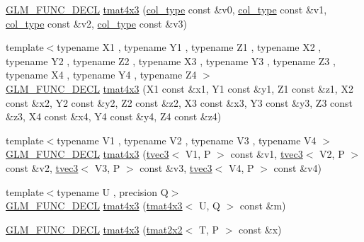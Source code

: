 \begin{DoxyCompactItemize}
\hyperlink{setup_8hpp_ab2d052de21a70539923e9bcbf6e83a51}{G\+L\+M\+\_\+\+F\+U\+N\+C\+\_\+\+D\+E\+CL} \hyperlink{structglm_1_1detail_1_1tmat4x3_a5783ce8745f4ea713c2c1cde65154aaf}{tmat4x3} (\hyperlink{structglm_1_1detail_1_1tmat4x3_a58afd510f7ab968e5a86e20f2f3979de}{col\+\_\+type} const \&v0, \hyperlink{structglm_1_1detail_1_1tmat4x3_a58afd510f7ab968e5a86e20f2f3979de}{col\+\_\+type} const \&v1, \hyperlink{structglm_1_1detail_1_1tmat4x3_a58afd510f7ab968e5a86e20f2f3979de}{col\+\_\+type} const \&v2, \hyperlink{structglm_1_1detail_1_1tmat4x3_a58afd510f7ab968e5a86e20f2f3979de}{col\+\_\+type} const \&v3)
\item 
{\footnotesize template$<$typename X1 , typename Y1 , typename Z1 , typename X2 , typename Y2 , typename Z2 , typename X3 , typename Y3 , typename Z3 , typename X4 , typename Y4 , typename Z4 $>$ }\\\hyperlink{setup_8hpp_ab2d052de21a70539923e9bcbf6e83a51}{G\+L\+M\+\_\+\+F\+U\+N\+C\+\_\+\+D\+E\+CL} \hyperlink{structglm_1_1detail_1_1tmat4x3_acca51e285af4cb8da90b02a67daadf05}{tmat4x3} (X1 const \&x1, Y1 const \&y1, Z1 const \&z1, X2 const \&x2, Y2 const \&y2, Z2 const \&z2, X3 const \&x3, Y3 const \&y3, Z3 const \&z3, X4 const \&x4, Y4 const \&y4, Z4 const \&z4)
\item 
{\footnotesize template$<$typename V1 , typename V2 , typename V3 , typename V4 $>$ }\\\hyperlink{setup_8hpp_ab2d052de21a70539923e9bcbf6e83a51}{G\+L\+M\+\_\+\+F\+U\+N\+C\+\_\+\+D\+E\+CL} \hyperlink{structglm_1_1detail_1_1tmat4x3_a8ef04c1736662e7373db390d7351114f}{tmat4x3} (\hyperlink{structglm_1_1detail_1_1tvec3}{tvec3}$<$ V1, P $>$ const \&v1, \hyperlink{structglm_1_1detail_1_1tvec3}{tvec3}$<$ V2, P $>$ const \&v2, \hyperlink{structglm_1_1detail_1_1tvec3}{tvec3}$<$ V3, P $>$ const \&v3, \hyperlink{structglm_1_1detail_1_1tvec3}{tvec3}$<$ V4, P $>$ const \&v4)
\item 
{\footnotesize template$<$typename U , precision Q$>$ }\\\hyperlink{setup_8hpp_ab2d052de21a70539923e9bcbf6e83a51}{G\+L\+M\+\_\+\+F\+U\+N\+C\+\_\+\+D\+E\+CL} \hyperlink{structglm_1_1detail_1_1tmat4x3_a1544dbd7a57f8c8d9ee9cbeb4e62bd3a}{tmat4x3} (\hyperlink{structglm_1_1detail_1_1tmat4x3}{tmat4x3}$<$ U, Q $>$ const \&m)
\item 
\hyperlink{setup_8hpp_ab2d052de21a70539923e9bcbf6e83a51}{G\+L\+M\+\_\+\+F\+U\+N\+C\+\_\+\+D\+E\+CL} \hyperlink{structglm_1_1detail_1_1tmat4x3_a15e5f3c44fc8d0b02c1a507e740d2359}{tmat4x3} (\hyperlink{structglm_1_1detail_1_1tmat2x2}{tmat2x2}$<$ T, P $>$ const \&x)

\end{DoxyCompactItemize}
